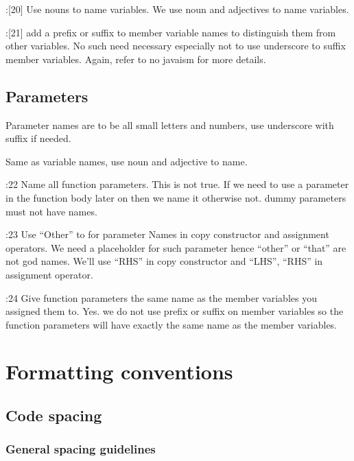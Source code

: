 \documentclass{book}
\begin{document}
\cite{OKL_MisfeldtBumgardnerGray2004CppStyle}:[20] Use nouns to name variables. We use noun and adjectives to name variables. 

\cite{OKL_MisfeldtBumgardnerGray2004CppStyle}:[21] add a prefix or suffix to member variable names to distinguish them from other variables. No such need necessary especially not to use underscore to suffix member variables. Again, refer to no javaism for more details. 

\section{Parameters}
\label{sec:ParameterNames}

Parameter names are to be all small letters and numbers, use underscore with suffix if needed.

Same as variable names, use noun and adjective to name. 

\cite{OKL_MisfeldtBumgardnerGray2004CppStyle}:22 Name all function parameters. This is not true. If we need to use a parameter in the function body later on then we name it otherwise not. dummy parameters must not have names.

\cite{OKL_MisfeldtBumgardnerGray2004CppStyle}:23 Use ``Other'' to for parameter Names in copy constructor and assignment operators. We need a placeholder for such parameter hence ``other'' or ``that'' are not god names. We'll use ``RHS'' in copy constructor and ``LHS'', ``RHS'' in assignment operator.

\cite{OKL_MisfeldtBumgardnerGray2004CppStyle}:24 Give function parameters the same name as the member variables you assigned them to. Yes. we do not use prefix or suffix on member variables so the function parameters will have exactly the same name as the member variables.  







\chapter{Formatting conventions}
\label{cha:Formatting}


\section{Code spacing}
\label{sec:CodeSpacing}

\subsection{General spacing guidelines}
\label{subsec:GenSpacing}
\end{document}
